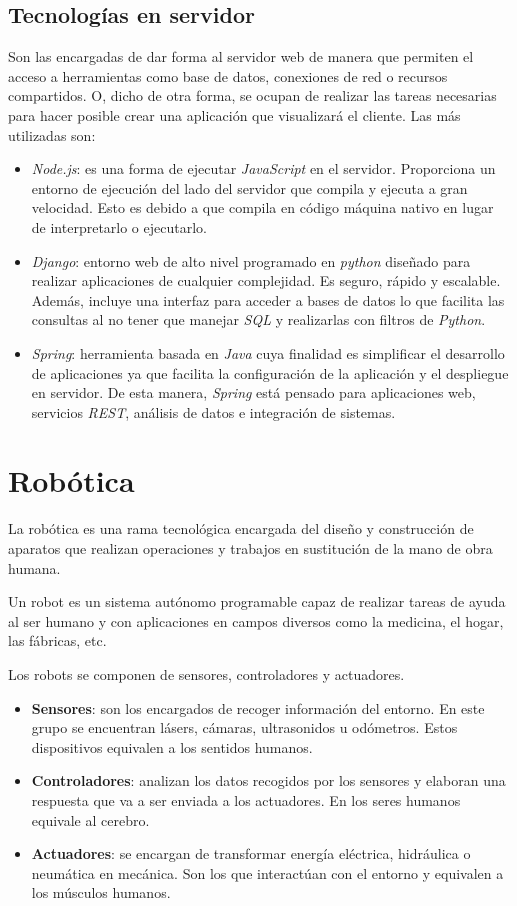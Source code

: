 \subsection{Tecnologías en servidor}
\label{subsec:tecserver}
Son las encargadas de dar forma al servidor web de manera que permiten el acceso a herramientas como base de datos, conexiones de red o recursos compartidos. O, dicho de otra forma, se ocupan de realizar las tareas necesarias para hacer posible crear una aplicación que visualizará el cliente. Las más utilizadas son: 
\begin{itemize}
    \item \textit{Node.js}: es una forma de ejecutar \textit{JavaScript} en el servidor. Proporciona un entorno de ejecución del lado del servidor que compila y ejecuta a gran velocidad. Esto es debido a que compila en código máquina nativo en lugar de interpretarlo o ejecutarlo.   
    \item \textit{Django}: entorno web de alto nivel programado en \textit{python} diseñado para realizar aplicaciones de cualquier complejidad. Es seguro, rápido y escalable. Además, incluye una interfaz para acceder a bases de datos lo que facilita las consultas al no tener que manejar \textit{SQL} y realizarlas con filtros de \textit{Python}.
    \item \textit{Spring}: herramienta basada en \textit{Java} cuya finalidad es simplificar el desarrollo de aplicaciones ya que facilita la configuración de la aplicación y el despliegue en servidor. De esta manera, \textit{Spring} está pensado para aplicaciones web, servicios \textit{REST}, análisis de datos e integración de sistemas. 
\end{itemize}

\section{Robótica}
\label{sec:robotica}
La robótica es una rama tecnológica encargada del diseño y construcción de aparatos que realizan operaciones y trabajos en sustitución de la mano de obra humana. 

Un robot es un sistema autónomo programable capaz de realizar tareas de ayuda al ser humano y con aplicaciones en campos diversos como la medicina, el hogar, las fábricas, etc. 

Los robots se componen de sensores, controladores y actuadores.
\begin{itemize}
    \item \textbf{Sensores}: son los encargados de recoger información del entorno. En este grupo se encuentran lásers, cámaras, ultrasonidos u odómetros. Estos dispositivos equivalen a los sentidos humanos. 
    \item \textbf{Controladores}: analizan los datos recogidos por los sensores y elaboran una respuesta que va a ser enviada a los actuadores. En los seres humanos equivale al cerebro. 
    \item \textbf{Actuadores}: se encargan de transformar energía eléctrica, hidráulica o neumática en mecánica. Son los que interactúan con el entorno y equivalen a los músculos humanos. 
\end{itemize}

